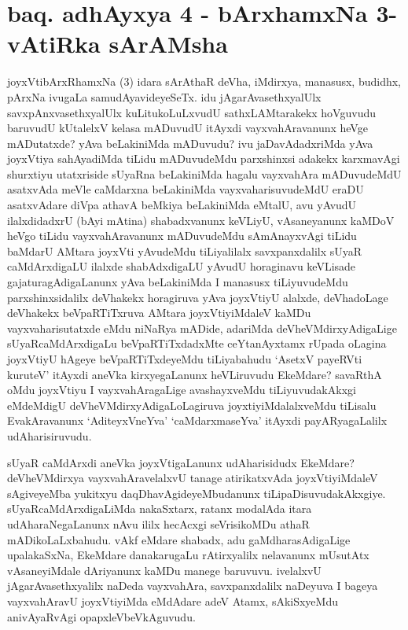 \section*{baq. adhAyxya 4 - bArxhamxNa 3-vAtiRka sArAMsha}

\begin{artha}%
joyxVtibArxRhamxNa (3) idara sArAthaR deVha, iMdirxya, manasusx, budidhx, pArxNa ivugaLa samudAyavideyeSeTx. idu jAgarAvasethxyalUlx savxpAnxvasethxyalUlx kuLitukoLuLxvudU sathxLAMtarakekx hoVguvudu baruvudU kUtalelxV kelasa mADuvudU itAyxdi vayxvahAravanunx heVge mADutatxde? yAva beLakiniMda mADuvudu? ivu jaDavAdadxriMda yAva joyxVtiya sahAyadiMda tiLidu mADuvudeMdu parxshinxsi adakekx karxmavAgi shurxtiyu utatxriside sUyaRna beLakiniMda hagalu vayxvahAra mADuvudeMdU asatxvAda meVle caMdarxna beLakiniMda vayxvaharisuvudeMdU eraDU asatxvAdare diVpa athavA beMkiya beLakiniMda eMtalU, avu yAvudU ilalxdidadxrU (bAyi mAtina) shabadxvanunx keVLiyU, vAsaneyanunx kaMDoV heVgo tiLidu vayxvahAravanunx mADuvudeMdu sAmAnayxvAgi tiLidu baMdarU AMtara joyxVti yAvudeMdu tiLiyalilalx savxpanxdalilx sUyaR caMdArxdigaLU ilalxde shabAdxdigaLU yAvudU horaginavu keVLisade gajaturagAdigaLanunx yAva beLakiniMda I manasusx tiLiyuvudeMdu parxshinxsidalilx deVhakekx horagiruva yAva joyxVtiyU alalxde, deVhadoLage deVhakekx beVpaRTiTxruva AMtara joyxVtiyiMdaleV kaMDu vayxvaharisutatxde eMdu niNaRya mADide, adariMda deVheVMdirxyAdigaLige sUyaRcaMdArxdigaLu beVpaRTiTxdadxMte ceYtanAyxtamx rUpada oLagina joyxVtiyU hAgeye beVpaRTiTxdeyeMdu tiLiyabahudu `AsetxV payeRVti kuruteV' itAyxdi aneVka kirxyegaLanunx heVLiruvudu EkeMdare? savaRthA oMdu joyxVtiyu I vayxvahAragaLige avashayxveMdu tiLiyuvudakAkxgi eMdeMdigU deVheVMdirxyAdigaLoLagiruva joyxtiyiMdalalxveMdu tiLisalu EvakAravanunx `AditeyxVneYva' `caMdarxmaseYva' itAyxdi payARyagaLalilx udAharisiruvudu.
\end{artha}

\begin{artha}
sUyaR caMdArxdi aneVka joyxVtigaLanunx udAharisidudx EkeMdare? deVheVMdirxya vayxvahAravelalxvU tanage atirikatxvAda joyxVtiyiMdaleV sAgiveyeMba yukitxyu daqDhavAgideyeMbudanunx tiLipaDisuvudakAkxgiye. sUyaRcaMdArxdigaLiMda nakaSxtarx, ratanx modalAda itara udAharaNegaLanunx nAvu ililx hecAcxgi seVrisikoMDu athaR mADikoLaLxbahudu. vAkf eMdare shabadx, adu gaMdharasAdigaLige upalakaSxNa, EkeMdare danakarugaLu rAtirxyalilx nelavanunx mUsutAtx vAsaneyiMdale dAriyanunx kaMDu manege baruvuvu. ivelalxvU jAgarAvasethxyalilx naDeda vayxvahAra, savxpanxdalilx naDeyuva I bageya vayxvahAravU joyxVtiyiMda eMdAdare adeV Atamx, sAkiSxyeMdu anivAyaRvAgi opapxleVbeVkAguvudu.
\end{artha}

